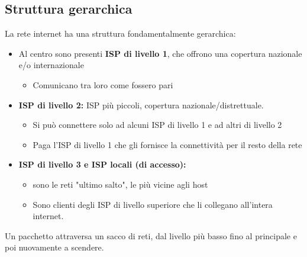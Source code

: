 \documentclass{report}
\begin{document}
	\subsection{Struttura gerarchica}
	La rete internet ha una struttura fondamentalmente gerarchica:
	\begin{itemize}
		\item Al centro sono presenti \textbf{ISP di livello 1}, che offrono una copertura nazionale e/o internazionale
		\begin{itemize}
			\item Comunicano tra loro come fossero pari
		\end{itemize}
		\item \textbf{ISP di livello 2:} ISP più piccoli, copertura nazionale/distrettuale.
		\begin{itemize}
			\item Si può connettere solo ad alcuni ISP di livello 1 e ad altri di livello 2
			\item Paga l'ISP di livello 1 che gli fornisce la connettività per il resto della rete
		\end{itemize}
		\item \textbf{ISP di livello 3 e ISP locali (di accesso):}
		\begin{itemize} 
			\item sono le reti "ultimo salto", le più vicine agli host
			\item Sono clienti degli ISP di livello superiore che li collegano all'intera internet.
		\end{itemize}
	\end{itemize}
	Un pacchetto attraversa un sacco di reti, dal livello più basso fino al principale e poi nuovamente a scendere.
\end{document}
